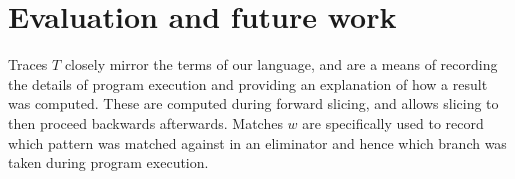\section{Evaluation and future work}



Traces $T$ closely mirror the terms of our language, and are a means of recording the details of program execution and providing an explanation of how a result was computed. These are computed during forward slicing, and allows slicing to then proceed backwards afterwards. Matches $w$ are specifically used to record which pattern was matched against in an eliminator and hence which branch was taken during program execution. 

\label{sec:evaluation}
